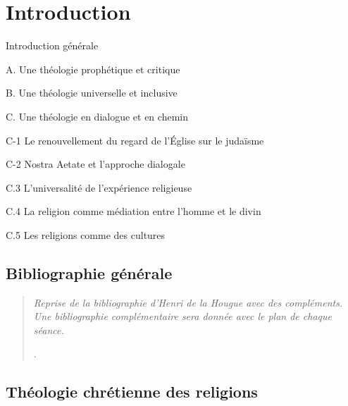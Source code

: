 \chapter{Introduction}


\bi 
\item Introduction générale
\item A. Une théologie prophétique et critique
\item B. Une théologie universelle et inclusive
\item C. Une théologie en dialogue et en chemin
\bi 
\item C-1 Le renouvellement du regard de l’Église sur le judaïsme
\item C-2 Nostra Aetate et l’approche dialogale
\item C.3 L’universalité de l’expérience religieuse
\item C.4 La religion comme médiation entre l’homme et le divin
\item C.5 Les religions comme des cultures
 \ei 
\ei 

\hypertarget{bibliographie-guxe9nuxe9rale}{%
\section{Bibliographie générale}\label{bibliographie-guxe9nuxe9rale}}

\begin{quote}
\emph{Reprise de la bibliographie d'Henri de la Hougue avec des
compléments. Une bibliographie complémentaire sera donnée avec le plan
de chaque séance.}

.
\end{quote}

\hypertarget{thuxe9ologie-chruxe9tienne-des-religions}{%
\section{Théologie chrétienne des
religions}\label{thuxe9ologie-chruxe9tienne-des-religions}}


